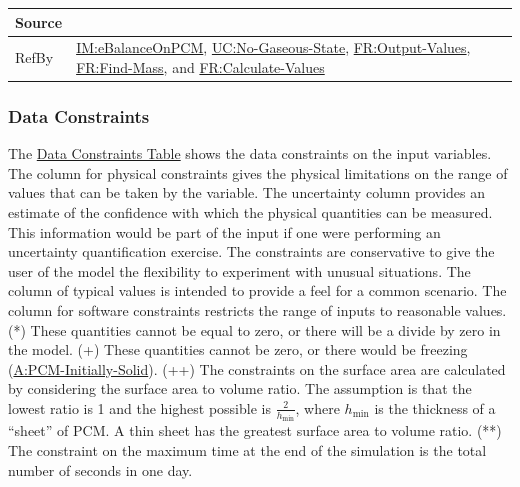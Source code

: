 \documentclass[12pt]{article}
\begin{document}
\begin{minipage}{\textwidth}
\begin{tabular}{>{\raggedright}p{}>{\raggedright\arraybackslash}p{}}
\\ \midrule
Source & \cite{koothoor2013}
         
\\ \midrule
RefBy & \hyperref[IM:eBalanceOnPCM]{IM:eBalanceOnPCM}, \hyperref[unlikeChgNGS]{UC:No-Gaseous-State}, \hyperref[outputValues]{FR:Output-Values}, \hyperref[findMass]{FR:Find-Mass}, and \hyperref[calcValues]{FR:Calculate-Values}
        
\\ \bottomrule
\end{tabular}
\end{minipage}

\subsubsection{Data Constraints}
\label{Sec:DataConstraints}
The \hyperref[Table:InDataConstraints]{Data Constraints Table} shows the data constraints on the input variables. The column for physical constraints gives the physical limitations on the range of values that can be taken by the variable. The uncertainty column provides an estimate of the confidence with which the physical quantities can be measured. This information would be part of the input if one were performing an uncertainty quantification exercise. The constraints are conservative to give the user of the model the flexibility to experiment with unusual situations. The column of typical values is intended to provide a feel for a common scenario. The column for software constraints restricts the range of inputs to reasonable values. (*) These quantities cannot be equal to zero, or there will be a divide by zero in the model. (+) These quantities cannot be zero, or there would be freezing (\hyperref[assumpPIS]{A:PCM-Initially-Solid}). (++) The constraints on the surface area are calculated by considering the surface area to volume ratio. The assumption is that the lowest ratio is 1 and the highest possible is $\frac{2}{{h_{\text{min}}}}$, where ${h_{\text{min}}}$ is the thickness of a ``sheet'' of PCM. A thin sheet has the greatest surface area to volume ratio. (**) The constraint on the maximum time at the end of the simulation is the total number of seconds in one day.
\end{document}
